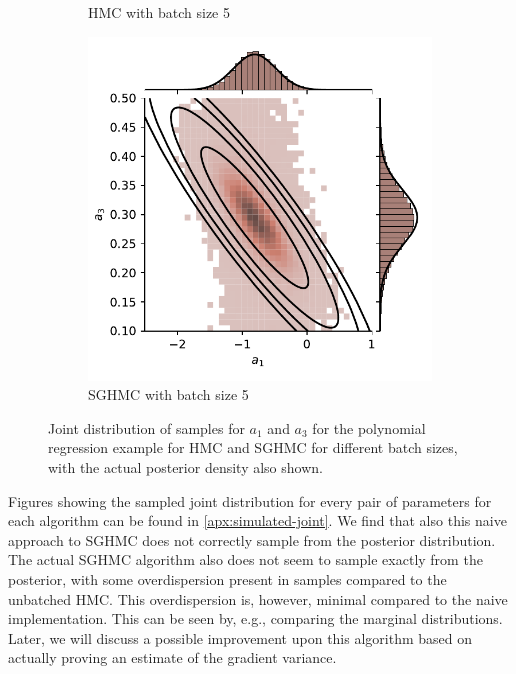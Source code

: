 \begin{figure}[htbp]
\begin{subfigure}[b]{0.45\linewidth}
        \caption{HMC with batch size 5}
    \end{subfigure}
    \begin{subfigure}[b]{0.45\linewidth}
        \centering
        \includegraphics[width=\linewidth]{Figures/simulated_joint_SGHMC_5.pdf} 
        \caption{SGHMC with batch size 5}
    \end{subfigure}
    \caption{Joint distribution of samples for $a_1$ and $a_3$ for the polynomial regression example for HMC and SGHMC for different batch sizes, with the actual posterior density also shown.}
    \label{fig:simulated_joint_comp}
\end{figure}
Figures showing the sampled joint distribution for every pair of parameters for each algorithm can be found in \cref{apx:simulated-joint}.
We find that also this naive approach to SGHMC does not correctly sample from the posterior distribution.
The actual SGHMC algorithm also does not seem to sample exactly from the posterior, with some overdispersion present in samples compared to the unbatched HMC. 
This overdispersion is, however, minimal compared to the naive implementation.
This can be seen by, e.g., comparing the marginal distributions.
Later, we will discuss a possible improvement upon this algorithm based on actually proving an estimate of the gradient variance.

